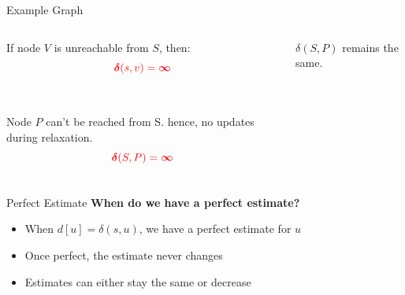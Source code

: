 \documentclass{beamer}
\begin{document}
\begin{frame}{Example Graph}
\begin{columns}
            
            
            If node \( V \) is unreachable from \( S \), then:
            \[
            \textcolor{red}{\boldsymbol{\delta}(s, v) = \boldsymbol{\infty}}
            \]
            \\
            \\ Node \( P \) can't be reached from S. hence, no updates during relaxation. \\

            \[
            \textcolor{red}{\boldsymbol{\delta}(S, P) = \boldsymbol{\infty}}
            \]

            \( \delta(S,P) \) remains the same.
        \end{columns}
    \end{frame}

    \begin{frame}{Perfect Estimate}
        \textbf{When do we have a perfect estimate?}
        
        \begin{itemize}
            \item When $d[u] = \delta(s,u)$, we have a perfect estimate for $u$
            \item Once perfect, the estimate never changes
            \item Estimates can either stay the same or decrease
        \end{itemize}
        
        \begin{center}
        \end{center}
    \end{frame}
\end{document}
